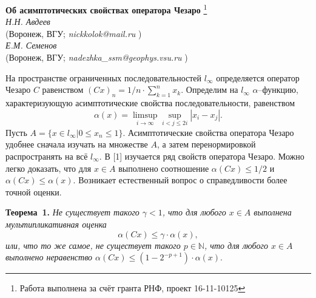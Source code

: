 \documentclass[a5paper,12pt,openbib]{report}
\begin{document}



\begin{center}{ \bf  Об асимптотических свойствах оператора Чезаро}%
\footnote{Работа выполнена за счёт гранта РНФ, проект 16-11-10125}
\\
{\it Н.Н. Авдеев } \\
(Воронеж, ВГУ; {\it nickkolok@mail.ru} ) \\
{\it Е.М. Семенов } \\
(Воронеж, ВГУ; {\it nadezhka\_ssm@geophys.vsu.ru}
)
\end{center}


\setcounter{equation}{0}


На пространстве ограниченных последовательностей $l_\infty$ определяется оператор Чезаро $C$
равенством
$
	(Cx)_n = {1}/{n} \cdot \sum_{k=1}^n x_k.
$
Определим на $l_\infty$ $\alpha$--функцию,
характеризующую асимптотические свойства последовательности,
равенством
$$
	\alpha(x) = \limsup_{i\to\infty}\sup_{i < j \leqslant 2i} |x_i - x_j|.
$$
Пусть $A = \{x\in l_\infty | 0 \leqslant x_n \leqslant 1\}$.
Асимптотические свойства оператора Чезаро удобнее сначала изучать на множестве $A$,
а затем перенормировкой распространять на всё $l_\infty$.
В [1] изучается ряд свойств оператора Чезаро.
Можно легко доказать, что для $x\in A$ выполнено соотношение $\alpha(Cx) \leqslant 1/2$
и $\alpha(Cx) \leqslant \alpha(x)$.
Возникает естественный вопрос о справедливости более точной оценки.

\textbf{Теорема~1.}
{\it
	Не существует такого $\gamma < 1$,
	что для любого $x\in A$ выполнена мультипликативная оценка
	$$
		\alpha(Cx) \leqslant \gamma \cdot \alpha(x)
	,
	$$
или, что то же самое, не существует такого $p\in \mathbb{N}$,
	что для любого $x\in A$ выполнено неравенство
	$
		\alpha(Cx) \leqslant (1-2^{-p+1})\cdot \alpha(x).
	$
}
\end{document}
